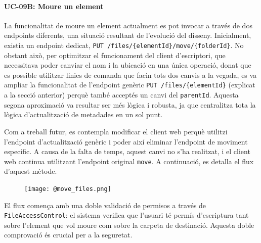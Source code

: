 \paragraph{UC-09B: Moure un element} La funcionalitat de moure un element actualment es pot invocar a través de dos endpoints diferents, una situació resultant de l'evolució del disseny. Inicialment, existia un endpoint dedicat, \texttt{PUT /files/\{elementId\}/move/\{folderId\}}. No obstant això, per optimitzar el funcionament del client d'escriptori, que necessitava poder canviar el nom i la ubicació en una única operació, donat que es possible utilitzar linies de comanda que facin tots dos canvis a la vegada, es va ampliar la funcionalitat de l'endpoint genèric \texttt{PUT /files/\{elementId\}} (explicat a la secció anterior) perquè també acceptés un canvi del \texttt{parentId}. Aquesta segona aproximació va resultar ser més lògica i robusta, ja que centralitza tota la lògica d'actualització de metadades en un sol punt.

Com a treball futur, es contempla modificar el client web perquè utilitzi l'endpoint d'actualització genèric i poder així eliminar l'endpoint de moviment específic. A causa de la falta de temps, aquest canvi no s'ha realitzat, i el client web continua utilitzant l'endpoint original \texttt{move}. A continuació, es detalla el flux d'aquest mètode.

\begin{figure}[H]
    \centering
    \texttt{[image: @move\_files.png]}
\end{figure}

El flux comença amb una doble validació de permisos a través de \texttt{FileAccessControl}: el sistema verifica que l'usuari té permís d'escriptura tant sobre l'element que vol moure com sobre la carpeta de destinació. Aquesta doble comprovació és crucial per a la seguretat.

